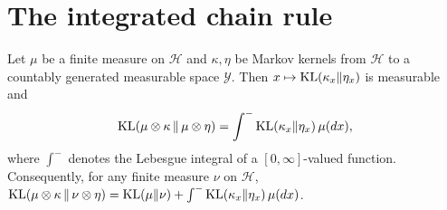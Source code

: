 \section{The integrated chain rule}
\label{sec:pre_info_chain}

\begin{lemma}\label{lem:kl_compProd_kernel}
\leanok
Let $\mu$ be a finite measure on $\mathcal{H}$ and $\kappa,\eta$ be Markov kernels from
$\mathcal{H}$ to a countably generated measurable space $\mathcal{Y}$. Then
$x \mapsto \mathrm{KL}(\kappa_x\|\eta_x)$ is measurable and
\[
  \mathrm{KL}(\mu\otimes\kappa\,\|\,\mu\otimes\eta) = \int^{-} \mathrm{KL}(\kappa_x\|\eta_x)\,\mu(dx) ,
\]
where $\int^-$ denotes the Lebesgue integral of a $[0,\infty]$-valued function. Consequently,
for any finite measure $\nu$ on $\mathcal{H}$,
$\mathrm{KL}(\mu\otimes\kappa\,\|\,\nu\otimes\eta) = \mathrm{KL}(\mu\|\nu) + \int^-\mathrm{KL}(\kappa_x\|\eta_x)\,\mu(dx)$.
\end{lemma}


